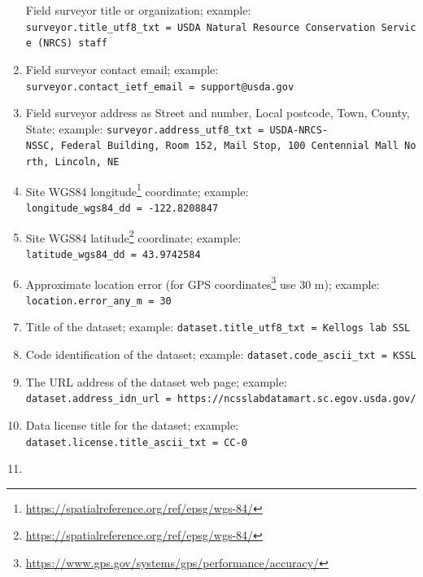 \documentclass[
  graybox,natbib,nospthms]{svmono}
\renewcommand{\href}[2]{#2 (\url{#1})}
\renewcommand{\href}[2]{#2\footnote{\url{#1}}}
\begin{document}
\begin{enumerate}
  Field surveyor title or organization; example: \texttt{surveyor.title\_utf8\_txt\ =\ \textquotesingle{}USDA\ Natural\ Resource\ Conservation\ Service\ (NRCS)\ staff\textquotesingle{}}\\
\item
  Field surveyor contact email; example: \texttt{surveyor.contact\_ietf\_email\ =\ \textquotesingle{}support@usda.gov\textquotesingle{}}\\
\item
  Field surveyor address as Street and number, Local postcode, Town, County, State; example: \texttt{surveyor.address\_utf8\_txt\ =\ \textquotesingle{}USDA-NRCS-NSSC,\ Federal\ Building,\ Room\ 152,\ Mail\ Stop,\ 100\ Centennial\ Mall\ North,\ Lincoln,\ NE\textquotesingle{}}\\
\item
  Site \href{https://spatialreference.org/ref/epsg/wgs-84/}{WGS84 longitude} coordinate; example: \texttt{longitude\_wgs84\_dd\ =\ \textquotesingle{}-122.8208847\textquotesingle{}}\\
\item
  Site \href{https://spatialreference.org/ref/epsg/wgs-84/}{WGS84 latitude} coordinate; example: \texttt{latitude\_wgs84\_dd\ =\ \textquotesingle{}43.9742584\textquotesingle{}}\\
\item
  Approximate location error (for \href{https://www.gps.gov/systems/gps/performance/accuracy/}{GPS coordinates} use 30 m); example: \texttt{location.error\_any\_m\ =\ \textquotesingle{}30\textquotesingle{}}\\
\item
  Title of the dataset; example: \texttt{dataset.title\_utf8\_txt\ =\ \textquotesingle{}Kellog\textquotesingle{}s\ lab\ SSL\textquotesingle{}}\\
\item
  Code identification of the dataset; example: \texttt{dataset.code\_ascii\_txt\ =\ \textquotesingle{}KSSL\textquotesingle{}}\\
\item
  The URL address of the dataset web page; example: \texttt{dataset.address\_idn\_url\ =\ \textquotesingle{}https://ncsslabdatamart.sc.egov.usda.gov/\textquotesingle{}}\\
\item
  Data license title for the dataset; example: \texttt{dataset.license.title\_ascii\_txt\ =\ \textquotesingle{}CC-0\textquotesingle{}}\\
\item

\end{enumerate}
\end{document}
